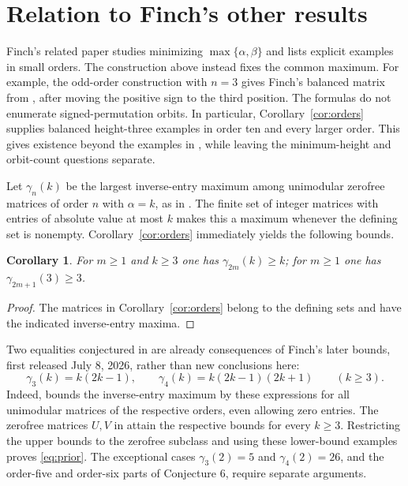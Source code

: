 \documentclass[11pt,a4paper]{article}
\newtheorem{corollary}[theorem]{Corollary}
\begin{document}
\section{Relation to Finch's other results}
Finch's related paper \cite[Sections 2--7]{roots} studies minimizing
$\max\{\alpha,\beta\}$ and lists explicit examples in small
orders. The construction above instead fixes the common maximum.
For example, the odd-order construction with $n=3$ gives Finch's
balanced matrix from \cite[Section 2, p.~3]{finch}, after moving
the positive sign to the third position. The formulas do not
enumerate signed-permutation orbits.
In particular, Corollary~\ref{cor:orders} supplies balanced height-three
examples in order ten and every larger order. This gives existence
beyond the examples in \cite[Addendum I, p.~15]{roots}, while leaving
the minimum-height and orbit-count questions separate.

Let $\gamma_n(k)$ be the largest inverse-entry maximum among unimodular
zerofree matrices of order $n$ with $\alpha=k$, as in
\cite[Section 9, p.~11]{finch}. The finite set of integer matrices with
entries of absolute value at most $k$ makes this a maximum whenever
the defining set is nonempty.
Corollary~\ref{cor:orders} immediately yields the following bounds.
\begin{corollary}\label{cor:gamma}
For $m\geq1$ and $k\geq3$ one has $\gamma_{2m}(k)\geq k$;
for $m\geq1$ one has $\gamma_{2m+1}(3)\geq3$.
\end{corollary}
\begin{proof}
The matrices in Corollary~\ref{cor:orders} belong to the defining sets
and have the indicated inverse-entry maxima.
\end{proof}

Two equalities conjectured in \cite[Conjecture 6, p.~11]{finch} are already
consequences of Finch's later bounds, first released July 8, 2026,
rather than new conclusions here:
\begin{equation}\label{eq:prior}
 \gamma_3(k)=k(2k-1),\qquad
 \gamma_4(k)=k(2k-1)(2k+1)\qquad(k\geq3).
\end{equation}
Indeed, \cite[Appendix 5.2, p.~17; Theorem (ii), p.~2]{large}
bounds the inverse-entry maximum by these expressions for all
unimodular matrices of the respective orders, even allowing zero entries.
The zerofree matrices $U,V$ in \cite[Section 9, p.~12]{finch}
attain the respective bounds for every $k\geq3$.
Restricting the upper bounds to the zerofree subclass and using these
lower-bound examples proves \eqref{eq:prior}.
The exceptional cases $\gamma_3(2)=5$ and $\gamma_4(2)=26$, and the
order-five and order-six parts of Conjecture 6, require separate arguments.
\end{document}
